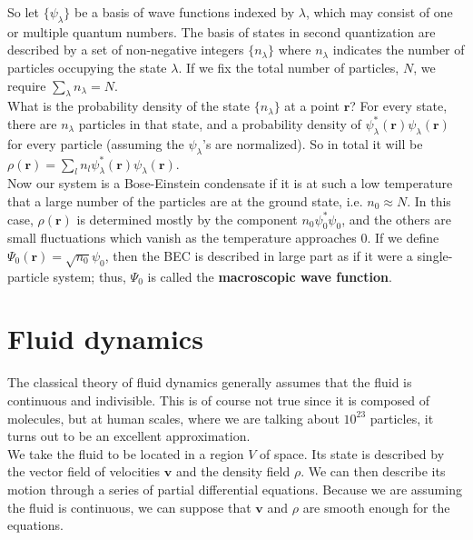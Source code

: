 \documentclass{article}
\begin{document}
So let $\{\psi_\lambda\}$ be a basis of wave functions indexed by $\lambda$, which may consist of one or multiple quantum numbers.  The basis of states in second quantization are described by a set of non-negative integers $\{n_\lambda\}$ where $n_\lambda$ indicates the number of particles occupying the state $\lambda$.  If we fix the total number of particles, $N$, we require $\sum_\lambda{n_\lambda} = N$.
\\

What is the probability density of the state $\{n_\lambda\}$ at a point $\mathbf{r}$?  For every state, there are $n_\lambda$ particles in that state, and a probability density of $\psi_\lambda^*(\mathbf{r}) \psi_\lambda(\mathbf{r})$ for every particle (assuming the $\psi_\lambda$'s are normalized). So in total it will be $\rho(\mathbf{r}) = \sum_l{n_l \psi_\lambda^*(\mathbf{r}) \psi_\lambda(\mathbf{r})}$.
\\

Now our system is a Bose-Einstein condensate if it is at such a low temperature that a large number of the particles are at the ground state, i.e. $n_0 \approx N$.  In this case, $\rho(\mathbf{r})$ is determined mostly by the component $n_0\psi^*_0\psi_0$, and the others are small fluctuations which vanish as the temperature approaches $0$.  If we define $\Psi_0(\mathbf{r}) = \sqrt{n_0} \psi_0$, then the BEC is described in large part as if it were a single-particle system; thus, $\Psi_0$ is called the \textbf{macroscopic wave function}.


\section{Fluid dynamics}
The classical theory of fluid dynamics generally assumes that the fluid is
continuous and indivisible.  This is of course not true since it is composed
of molecules, but at human scales, where we are talking about $10^{23}$
particles, it turns out to be an excellent approximation.
\\

We take the fluid to be located in a region $V$ of space.  Its state is
described by the vector field of velocities $\mathbf{v}$ and the density
field $\rho$.  We can then describe its motion through a series of partial
differential equations.  Because we are assuming the fluid is continuous, we
can suppose that $\mathbf{v}$ and $\rho$ are smooth enough for the equations.
\\
\end{document}
